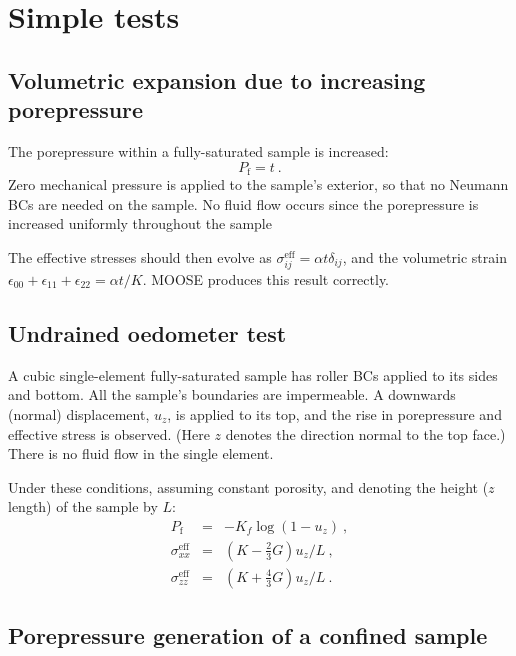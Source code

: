 \documentclass[]{scrreprt}
\begin{document}
\chapter{Simple tests}

\section{Volumetric expansion due to increasing porepressure}

The porepressure within a fully-saturated sample is increased:
\begin{equation}
P_{\mathrm{f}} = t \ .
\end{equation}
Zero mechanical pressure is applied to the sample's exterior, so that
no Neumann BCs are needed on the sample.  No fluid flow occurs since
the porepressure is increased uniformly throughout the sample

The effective stresses should then evolve as
$\sigma_{ij}^{\mathrm{eff}} = \alpha t \delta_{ij}$, and the
volumetric strain $\epsilon_{00}+\epsilon_{11}+\epsilon_{22} = \alpha
t/K$.  MOOSE produces this result correctly.

\section{Undrained oedometer test}

A cubic single-element fully-saturated sample has roller BCs applied
to its sides and bottom.  All the sample's boundaries are impermeable.
A downwards (normal) displacement, $u_{z}$, is applied to its
top, and the rise in porepressure and effective stress is observed.
(Here $z$ denotes the direction normal to the top face.)  There is
no fluid flow in the single element.

Under these conditions, assuming constant porosity, and denoting the
height ($z$ length) of the sample by $L$:
\begin{eqnarray}
P_{\mathrm{f}} & = & -K_{f}\log(1 - u_{z}) \ , \nonumber \\
\sigma_{xx}^{\mathrm{eff}} & = & (K - \mbox{$\frac{2}{3}$}G)u_{z}/L \ , \nonumber \\
\sigma_{zz}^{\mathrm{eff}} & = & (K + \mbox{$\frac{4}{3}$}G)u_{z}/L \ .
\end{eqnarray}

\section{Porepressure generation of a confined sample}
\end{document}
